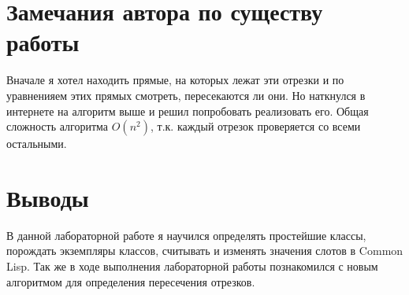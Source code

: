 \documentclass[12pt]{article}
\begin{document}
\section{Замечания автора по существу работы}
{\large 
	Вначале я хотел находить прямые, на которых лежат эти отрезки и по уравненияем 
	этих прямых смотреть, пересекаются ли они. Но наткнулся в интернете на алгоритм
	выше и решил попробовать реализовать его.
	Общая сложность алгоритма $O(n^2)$, т.к. каждый отрезок проверяется со всеми остальными.
}

\section{Выводы}
{\large 
	В данной лабораторной работе я научился определять простейшие классы, порождать
	экземпляры классов, считывать и изменять значения слотов в Common Lisp. 
	Так же в ходе выполнения лабораторной работы познакомился с новым алгоритмом
	для определения пересечения отрезков.
}
\end{document}
